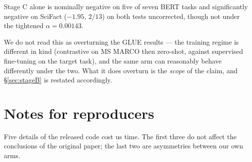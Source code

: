 \documentclass{article}
\begin{document}
Stage C alone is nominally negative on five of seven BERT tasks and
significantly negative on SciFact ($-1.95$, $2/13$) on both tests uncorrected,
though not under the tightened $\alpha=0.00143$.

We do not read this as overturning the GLUE results --- the training regime is
different in kind (contrastive on MS MARCO then zero-shot, against supervised
fine-tuning on the target task), and the same arm can reasonably behave
differently under the two. What it does overturn is the \emph{scope} of the
claim, and \S\ref{sec:stageB} is restated accordingly.

\section{Notes for reproducers}
\label{app:defects}

Five details of the released code cost us time. The first three do not affect
the conclusions of the original paper; the last two are asymmetries between our
own arms.
\end{document}
